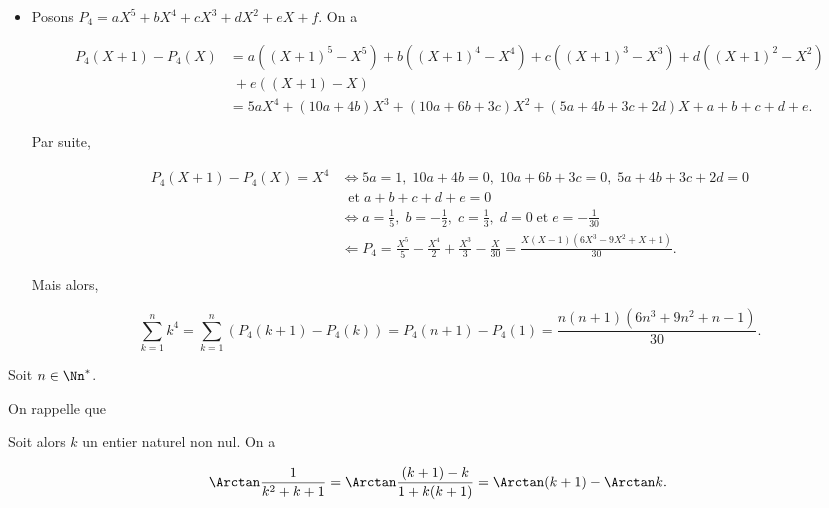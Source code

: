{\begin{enumerate}
{\begin{itemize}
Mais alors,

$$\sum_{k=1}^{n}k^3=\sum_{k=1}^{n}(P_3(k+1)-P_3(k))=P_3(n+1)-P_3(1)=\frac{n^2(n+1)^2}{4}.$$
\item[\textbf{- Calcul de} $\bf{S_4}$.] Posons $P_4=aX^5+bX^4+cX^3+dX^2+eX+f$. On a

\begin{align*}
P_4(X+1)-P_4(X)&=a((X+1)^5-X^5)+b((X+1)^4-X^4)+c((X+1)^3-X^3)+d((X+1)^2-X^2)\\
 &\;+e((X+1)-X)\\
 &=5aX^4+(10a+4b)X^3+(10a+6b+3c)X^2+(5a+4b+3c+2d)X+a+b+c+d+e.
\end{align*}

Par suite,

\begin{align*}
P_4(X+1)-P_4(X)=X^4&\Leftrightarrow5a=1,\;10a+4b=0,\;10a+6b+3c=0,\;5a+4b+3c+2d=0\\
 &\;\;\mbox{et}\;a+b+c+d+e=0\\
 &\Leftrightarrow
a=\frac{1}{5},\;b=-\frac{1}{2},\;c=\frac{1}{3},\;d=0\;\mbox{et}\;e=-\frac{1}{30}\\
 &\Leftarrow P_4=\frac{X^5}{5}-\frac{X^4}{2}+\frac{X^3}{3}-\frac{X}{30}=\frac{X(X-1)(6X^3-9X^2+X+1)}{30}.
\end{align*}

Mais alors,

$$\sum_{k=1}^{n}k^4=\sum_{k=1}^{n}(P_4(k+1)-P_4(k))=P_4(n+1)-P_4(1)=\frac{n(n+1)(6n^3+9n^2+n-1)}{30}.$$
\end{itemize}
\begin{center}
\end{center}
Soit $n\in\Nn^*$.

On rappelle que 
\begin{center}
\fbox{
$\forall(a,b)\in]0,+\infty[^2,\;\Arctan a-\Arctan b=\Arctan\frac{a-b}{1+ab}.$
}
\end{center}

Soit alors $k$ un entier naturel non nul. On a

$$\Arctan\frac{1}{k^2+k+1}=\Arctan\frac{(k+1)-k}{1+k(k+1)}=\Arctan(k+1)-\Arctan k.$$

}
\end{enumerate}}
